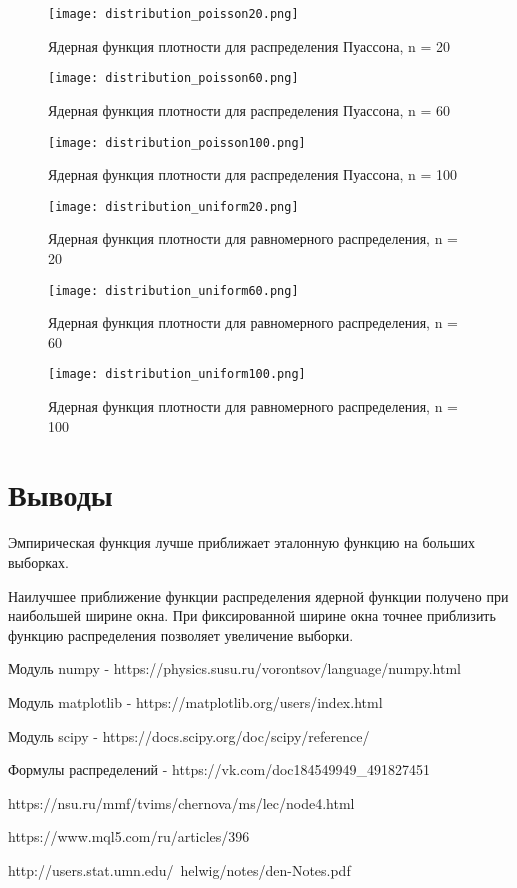 \documentclass[a4]{article}
\begin{document}
\begin{center}
    \begin{figure}[H]
 \caption{Ядерная функция плотности для распределения Пуассона, n = 20}
\texttt{[image: distribution\_poisson20.png]}
\end{figure}
    \begin{figure}[H]
 \caption{Ядерная функция плотности для распределения Пуассона, n = 60}
\texttt{[image: distribution\_poisson60.png]}
\end{figure}
    \begin{figure}[H]
 \caption{Ядерная функция плотности для распределения Пуассона, n = 100}
\texttt{[image: distribution\_poisson100.png]}
\end{figure}

    \begin{figure}[H]
 \caption{Ядерная функция плотности для равномерного распределения, n = 20}
\texttt{[image: distribution\_uniform20.png]}
\end{figure}
    \begin{figure}[H]
 \caption{Ядерная функция плотности для равномерного распределения, n = 60}
\texttt{[image: distribution\_uniform60.png]}
\end{figure}
    \begin{figure}[H]
 \caption{Ядерная функция плотности для равномерного распределения, n = 100}
\texttt{[image: distribution\_uniform100.png]}
\end{figure}
\end{center}

\section{Выводы}
Эмпирическая функция лучше приближает эталонную функцию на больших выборках.

Наилучшее приближение функции распределения ядерной функции получено при наибольшей ширине окна. При фиксированной ширине окна точнее приблизить функцию распределения позволяет увеличение выборки.


\begin{thebibliography}{}
      Модуль numpy  -  https://physics.susu.ru/vorontsov/language/numpy.html
    
    Модуль matplotlib - https://matplotlib.org/users/index.html
    
    Модуль scipy - https://docs.scipy.org/doc/scipy/reference/
    
    Формулы распределений  -  https://vk.com/doc184549949\_491827451
    
    https://nsu.ru/mmf/tvims/chernova/ms/lec/node4.html
    
    https://www.mql5.com/ru/articles/396
    
    http://users.stat.umn.edu/~helwig/notes/den-Notes.pdf
\end{thebibliography}
\end{document}
